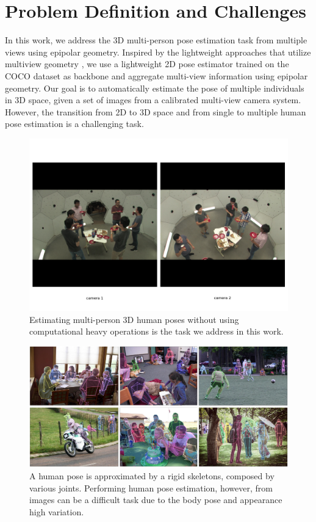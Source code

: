 \section{Problem Definition and Challenges}
In this work, we address the 3D multi-person pose estimation task from multiple views using epipolar geometry. Inspired by the lightweight approaches that utilize multiview geometry \cite{multiviewpose, epipolartransformers, zhang2020adafuse}, we use a lightweight 2D pose estimator trained on the COCO dataset as backbone and aggregate multi-view information using epipolar geometry. Our goal is to automatically estimate the pose of multiple individuals in 3D space, given a set of images from a calibrated multi-view camera system.  However, the transition from 2D to 3D space and from single to multiple human pose estimation is a challenging task.

\begin{figure}[htpb]
	\centering
	\includegraphics[width=0.7\columnwidth]{figures/ch1/Figure_1.png}
	\caption{Estimating multi-person 3D human poses without using computational heavy operations is the task we address in this work.}
	\label{fig:ch1-multiview-occlusion}
\end{figure}

\begin{figure}[htpb]
	\centering
	\includegraphics[width=0.7\columnwidth]{figures/ch1/coco-dataset.png}
	\caption{A human pose is approximated by a rigid skeletons, composed by various joints. Performing human pose estimation, however, from images can be a difficult task due to the body pose and appearance high variation.}
	\label{fig:ch1-coco-dataset}
\end{figure}

